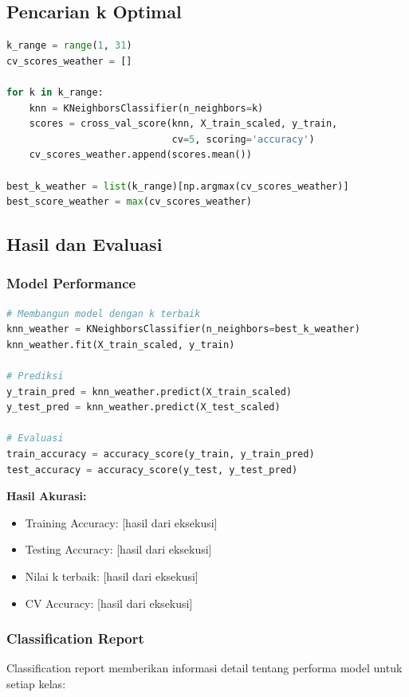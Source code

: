 \documentclass[12pt,a4paper]{article}
\begin{document}
\subsection{Pencarian k Optimal}

\begin{lstlisting}[language=Python, caption=Pencarian k Optimal dengan Cross-Validation]
k_range = range(1, 31)
cv_scores_weather = []

for k in k_range:
    knn = KNeighborsClassifier(n_neighbors=k)
    scores = cross_val_score(knn, X_train_scaled, y_train, 
                             cv=5, scoring='accuracy')
    cv_scores_weather.append(scores.mean())

best_k_weather = list(k_range)[np.argmax(cv_scores_weather)]
best_score_weather = max(cv_scores_weather)
\end{lstlisting}

\subsection{Hasil dan Evaluasi}

\subsubsection{Model Performance}
\begin{lstlisting}[language=Python, caption=Training dan Evaluasi Model]
# Membangun model dengan k terbaik
knn_weather = KNeighborsClassifier(n_neighbors=best_k_weather)
knn_weather.fit(X_train_scaled, y_train)

# Prediksi
y_train_pred = knn_weather.predict(X_train_scaled)
y_test_pred = knn_weather.predict(X_test_scaled)

# Evaluasi
train_accuracy = accuracy_score(y_train, y_train_pred)
test_accuracy = accuracy_score(y_test, y_test_pred)
\end{lstlisting}

\textbf{Hasil Akurasi:}
\begin{itemize}
    \item Training Accuracy: [hasil dari eksekusi]
    \item Testing Accuracy: [hasil dari eksekusi]
    \item Nilai k terbaik: [hasil dari eksekusi]
    \item CV Accuracy: [hasil dari eksekusi]
\end{itemize}

\subsubsection{Classification Report}
Classification report memberikan informasi detail tentang performa model untuk setiap kelas:
\end{document}
